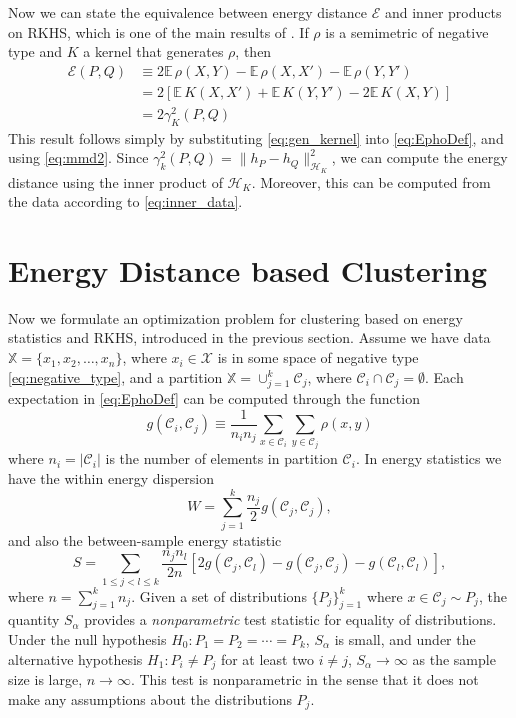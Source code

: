 \documentclass{article}
\newcommand\Energy{\mathcal{E}}
\newcommand\E{\mathbb{E}}
\newcommand\kk{K}
\newcommand\kkk{h}
\newcommand\Hk{{\mathcal{H}}_{\kk}}
\newcommand\C{{\mathcal{C}}}
\begin{document}
Now we can state the equivalence between energy distance $\Energy$ and
inner products on RKHS, which is one of the main results of
\cite{Sejdinovic2013}. If $\rho$ is a semimetric
of negative type and $\kk$ a kernel that generates $\rho$, then
\begin{align}
\Energy(P, Q) &\equiv 2\E \, \rho(X,Y) - \E \, \rho(X,X') - \E \, \rho(Y,Y') 
\label{eq:EphoDef}\\
&= 2 \left[ \E \, \kk(X, X') + \E \, \kk(Y, Y') - 2\E \, \kk(X, Y)\right] \\
&=2 \gamma_\kk^2(P,Q) 
\end{align}
This result follows simply by substituting \eqref{eq:gen_kernel} into
\eqref{eq:EphoDef}, and using \eqref{eq:mmd2}.
Since $\gamma_k^2(P, Q) = \| \kkk_P - \kkk_Q \|^2_{\Hk}$, we
can compute the energy distance using the inner product of $\Hk$. Moreover,
this can be computed from the data according to \eqref{eq:inner_data}.


\section{Energy Distance based Clustering}
\label{sec:clustering_theory}

Now we formulate an optimization problem for clustering based on 
energy statistics
and RKHS, introduced in the previous section.
Assume we have data $\mathbb{X} = \{ x_1,x_2,\dotsc, x_n \}$, where
$x_i \in \mathcal{X}$ is in some space of 
negative type \eqref{eq:negative_type},
and a partition $\mathbb{X} = \cup_{j=1}^k \C_j$, where
$\C_i \cap \C_j = \emptyset$.
Each expectation in 
\eqref{eq:EphoDef}
can be computed 
through the function
\begin{equation}
\label{eq:g_def}
g (\C_i, \C_j) \equiv 
\dfrac{1}{n_i n_j}
\sum_{x \in \C_i} 
\sum_{y \in \C_j} \rho(x, y)
\end{equation}
where $n_i = |\C_i|$ is the number of elements in partition
$\C_i$. In energy statistics 
\cite{Szkely2013} we have the within energy dispersion
\begin{equation}
\label{eq:within}
W = 
\sum_{j=1}^{k} \dfrac{n_j}{2} g(\C_j, \C_j),
\end{equation}
and also the between-sample energy statistic
\begin{equation}
S = 
\sum_{1 \le  j < l \le k } \dfrac{n_j n_{l}}{2 n} \left[
2 g(\C_j, \C_l) - 
g(\C_j, \C_j) - 
g(\C_l, \C_l)
\right],
\end{equation}
where $n=\sum_{j=1}^{k} n_j$. Given a set of distributions
$\{ P_j\}_{j=1}^k$ where $x \in \C_j \sim P_j$, the quantity
$S_\alpha$ provides
a \emph{nonparametric} test statistic for equality of distributions.
Under the null hypothesis $H_0: P_1=P_2=\dotsm=P_k$, $S_\alpha$ is small, 
and under
the alternative hypothesis $H_1: P_i \ne P_j$ for at least two $i\ne j$, 
$S_\alpha \to \infty$ as the sample size is large, $n \to \infty$.
This test is nonparametric in the sense that it does not make any assumptions
about the distributions $P_j$.
\end{document}
